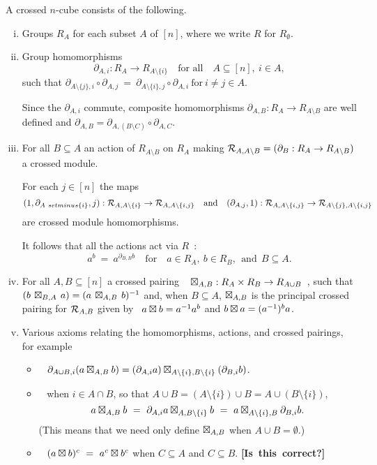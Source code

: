 \bigskip
A crossed $n$-cube consists of the following.
\begin{enumerate}[(i)]
\item
Groups  $R_A$  for each subset  $A$  of  $[n]$,
where we write $R$ for $R_{\emptyset}$.

\item
Group homomorphisms
$$
\partial_{A,i} : R_A \to R_{A \setminus \{i\}}  \quad\mbox{for all} \quad 
A \subseteq [n],~ i \in A, 
$$
such that  
$\partial_{A \setminus \{j\},i} \circ \partial_{A,j} 
~=~ \partial_{A \setminus \{i\},j} \circ \partial_{A,i} 
~\mbox{for}~ i \neq j \in A$.

\noindent
Since the $\partial_{A,i}$ commute, composite homomorphisms
$\partial_{A,B} : R_A \to R_{A \setminus B}$ are well defined and 
$\partial_{A,B} = \partial_{A,(B \setminus C)} \circ \partial_{A,C}$. 

\item
For all $B \subseteq A$ an action of $R_{A \setminus B}$ on $R_A$
making $\mathcal{R}_{A,A \setminus B} = (\partial_B : R_A \to R_{A \setminus B})$
a crossed module.

For each $j \in [n]$ the maps 
$$
(1,\partial_{A \ setminus \{i\}},j) : \mathcal{R}_{A,A \setminus \{i\}} \to 
\mathcal{R}_{A,A \setminus \{i,j\}}
\quad\mbox{and}\quad
(\partial_{A,j},1) : \mathcal{R}_{A,A \setminus \{i,j\}} \to 
\mathcal{R}_{A \setminus \{j\},A \setminus \{i,j\}}
$$
are crossed module homomorphisms.

It follows that all the actions act via $R$~:
$$
a^b ~=~ a^{\partial_{B,B} b} \quad\mbox{for}\quad
a \in R_A,~ b \in R_B, ~~\mbox{and}~~ B \subseteq A.
$$

\item
For all  $A,B \subseteq [n]$  a crossed pairing  ~
$\boxtimes_{A,B} : R_A \times R_B \to R_{A \cup B}$~,
such that
$(b\,\boxtimes_{B,A}\,a) = (a\,\boxtimes_{A,B}\,b)^{-1}$  and, when $B \subseteq A$,
$\boxtimes_{A,B}$  is the principal crossed pairing for $\mathcal{R}_{A,B}$ 
given by ~$a \boxtimes b = a^{-1}a^b$ and $b \boxtimes a = (a^{-1})^ba$.

\item
Various axioms relating the homomorphisms, actions, and crossed pairings, 
for example
\begin{itemize}
\item~ $\partial_{A \cup B,i}(a \boxtimes_{A,B} b) = 
    (\partial_{A,i} a) \boxtimes_{A\setminus\{i\},B\setminus\{i\}} (\partial_{B,i} b)$.
\item~ when $i \in A \cap B$, so that
$A \cup B = (A \setminus \{i\}) \cup B = A \cup (B \setminus \{i\})$,
$$
a \boxtimes_{A,B} b
~=~ \partial_{A,i} a \boxtimes_{A,B\setminus\{i\}} b
~=~ a \boxtimes_{A\setminus\{i\},B} \partial_{B,i} b.
$$
(This means that we need only define $\boxtimes_{A,B}$ when $A \cup B = \emptyset$.)
\item~ $(a \boxtimes b)^c ~=~ a^c \boxtimes b^c$ when $C \subseteq A$ and $C \subseteq B$.
\qquad
\mbox{{\bf [Is this correct?]}}
\end{itemize}
\end{enumerate}

